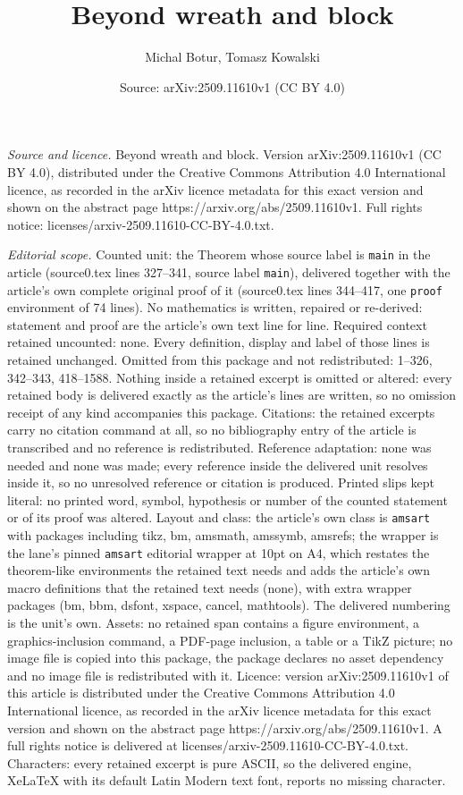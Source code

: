 \documentclass[10pt,a4paper]{amsart}
\title[Beyond wreath and block]{Beyond wreath and block}
\author{Michal Botur, Tomasz Kowalski}
\date{Source: arXiv:2509.11610v1 (CC BY 4.0)}
\begin{document}
\maketitle

\noindent\emph{Source and licence.} Beyond wreath and block. Version arXiv:2509.11610v1 (CC BY 4.0), distributed under the Creative Commons Attribution 4.0 International licence, as recorded in the arXiv licence metadata for this exact version and shown on the abstract page https://arxiv.org/abs/2509.11610v1. Full rights notice: licenses/arxiv-2509.11610-CC-BY-4.0.txt.\par\smallskip

\noindent\textit{Editorial scope.} Counted unit: the Theorem whose source label is \texttt{main} in the article (source0.tex lines 327--341, source label \texttt{main}), delivered together with the article's own complete original proof of it (source0.tex lines 344--417, one \texttt{proof} environment of 74 lines). No mathematics is written, repaired or re-derived: statement and proof are the article's own text line for line. Required context retained uncounted: none. Every definition, display and label of those lines is retained unchanged. Omitted from this package and not redistributed: 1--326, 342--343, 418--1588. Nothing inside a retained excerpt is omitted or altered: every retained body is delivered exactly as the article's lines are written, so no omission receipt of any kind accompanies this package. Citations: the retained excerpts carry no citation command at all, so no bibliography entry of the article is transcribed and no reference is redistributed. Reference adaptation: none was needed and none was made; every reference inside the delivered unit resolves inside it, so no unresolved reference or citation is produced. Printed slips kept literal: no printed word, symbol, hypothesis or number of the counted statement or of its proof was altered. Layout and class: the article's own class is \texttt{amsart} with packages including tikz, bm, amsmath, amssymb, amsrefs; the wrapper is the lane's pinned \texttt{amsart} editorial wrapper at 10pt on A4, which restates the theorem-like environments the retained text needs and adds the article's own macro definitions that the retained text needs (none), with extra wrapper packages (bm, bbm, dsfont, xspace, cancel, mathtools). The delivered numbering is the unit's own. Assets: no retained span contains a figure environment, a graphics-inclusion command, a PDF-page inclusion, a table or a TikZ picture; no image file is copied into this package, the package declares no asset dependency and no image file is redistributed with it. Licence: version arXiv:2509.11610v1 of this article is distributed under the Creative Commons Attribution 4.0 International licence, as recorded in the arXiv licence metadata for this exact version and shown on the abstract page https://arxiv.org/abs/2509.11610v1. A full rights notice is delivered at licenses/arxiv-2509.11610-CC-BY-4.0.txt. Characters: every retained excerpt is pure ASCII, so the delivered engine, XeLaTeX with its default Latin Modern text font, reports no missing character.
\end{document}
